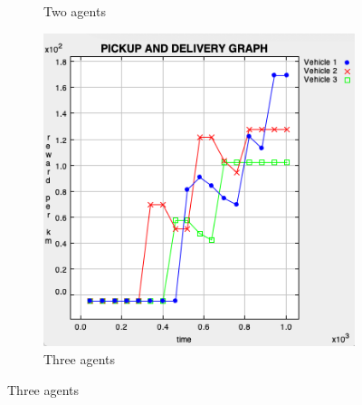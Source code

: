 \documentclass[11pt]{article}
\begin{document}
\begin{figure}[ht]
\begin{subfigure}[t]{0.175\textwidth}
    \caption{Two agents}
    \label{fig:2b}
  \end{subfigure}
  \begin{subfigure}[t]{0.175\textwidth}
    \includegraphics[width=\textwidth, frame]{9T3A.png}
    \caption{Three agents}
    \label{fig:2c}
  \end{subfigure}
\end{figure}
\end{document}
